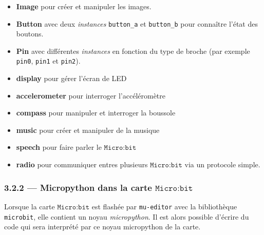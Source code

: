 \documentclass[a4paper,17pt]{extarticle}
\providecommand{\tightlist}{%
      \setlength{\itemsep}{0pt}\setlength{\parskip}{0pt}}
\begin{document}
\begin{itemize}
\tightlist
\item
  \textbf{Image} pour créer et manipuler les images.
\item
  \textbf{Button} avec deux \emph{instances} \texttt{button\_a} et
  \texttt{button\_b} pour connaître l'état des boutons.
\item
  \textbf{Pin} avec différentes \emph{instances} en fonction du type de
  broche (par exemple \texttt{pin0}, \texttt{pin1} et \texttt{pin2}).
\item
  \textbf{display} pour gérer l'écran de LED
\item
  \textbf{accelerometer} pour interroger l'accéléromètre
\item
  \textbf{compass} pour manipuler et interroger la boussole
\item
  \textbf{music} pour créer et manipuler de la musique
\item
  \textbf{speech} pour faire parler le \(\texttt{Micro:bit}\)
\item
  \textbf{radio} pour communiquer entres plusieurs
  \(\texttt{Micro:bit}\) via un protocole simple.
\end{itemize}

    \hypertarget{micropython-dans-la-carte-textttmicrobit}{%
\subsubsection{\texorpdfstring{3.2.2 --- Micropython dans la carte
\(\texttt{Micro:bit}\)}{3.2.2 --- Micropython dans la carte \textbackslash texttt\{Micro:bit\}}}\label{micropython-dans-la-carte-textttmicrobit}}

    Lorsque la carte \(\texttt{Micro:bit}\) est flashée par
\texttt{mu-editor} avec la bibliothèque \texttt{microbit}, elle contient
un noyau \emph{micropython}. Il est alors possible d'écrire du code qui
sera interprété par ce noyau micropython de la carte.
\end{document}

